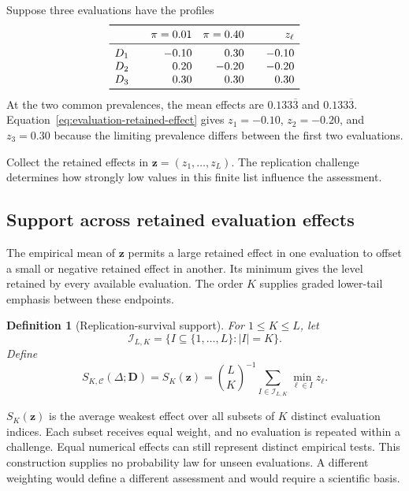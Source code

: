 \documentclass[11pt]{article}
\newcommand{\CSet}{\mathcal{C}}
\newtheorem{definition}{Definition}
\theoremstyle{remark}
\begin{document}
Suppose three evaluations have the profiles
\[
\begin{array}{c@{\qquad}rr@{\qquad}r}
\toprule
& \pi=0.01 & \pi=0.40 & z_\ell \\
\midrule
D_1 & -0.10 & \phantom{-}0.30 & -0.10 \\
D_2 & \phantom{-}0.20 & -0.20 & -0.20 \\
D_3 & \phantom{-}0.30 & \phantom{-}0.30 & \phantom{-}0.30 \\
\bottomrule
\end{array}
\]
At the two common prevalences, the mean effects are $0.133\overline{3}$ and
$0.133\overline{3}$. Equation~\eqref{eq:evaluation-retained-effect} gives
$z_1=-0.10$, $z_2=-0.20$, and $z_3=0.30$ because the limiting prevalence
differs between the first two evaluations.

Collect the retained effects in $\mathbf z=(z_1,\ldots,z_L)$. The replication challenge determines how strongly low values in this finite list influence the assessment.

\subsection{Support across retained evaluation effects}

The empirical mean of $\mathbf z$ permits a large retained effect in one evaluation to offset a small or negative retained effect in another. Its minimum gives the level retained by every available evaluation. The order $K$ supplies graded lower-tail emphasis between these endpoints.

\begin{definition}[Replication-survival support]
\label{def:support}
For $1\leq K\leq L$, let
\[
\mathcal I_{L,K}
=
\{I\subseteq\{1,\ldots,L\}:|I|=K\}.
\]
Define
\begin{equation}
S_{K,\CSet}(\Delta;\mathbf D)
=
S_K(\mathbf z)
=
\binom{L}{K}^{-1}
\sum_{I\in\mathcal I_{L,K}}
\min_{\ell\in I}z_\ell.
\label{eq:robust-support}
\end{equation}
\end{definition}

$S_K(\mathbf z)$ is the average weakest effect over all subsets of $K$
distinct evaluation indices. Each subset receives equal weight, and no
evaluation is repeated within a challenge. Equal numerical effects can still
represent distinct empirical tests. This construction supplies no probability
law for unseen evaluations. A different weighting would define a different
assessment and would require a scientific basis.
\end{document}
